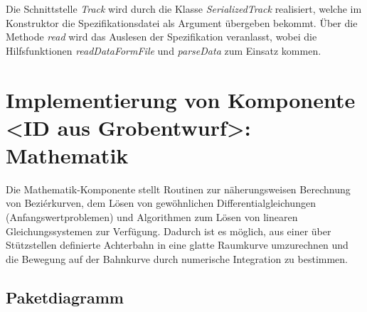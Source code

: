 Die Schnittstelle \emph{Track} wird durch die Klasse \emph{SerializedTrack} realisiert,
welche im Konstruktor die Spezifikationsdatei als Argument übergeben bekommt. Über
die Methode \emph{read} wird das Auslesen der Spezifikation veranlasst, wobei
die Hilfsfunktionen \emph{readDataFormFile} und \emph{parseData} zum Einsatz kommen.

\section{Implementierung von Komponente
         <ID aus Grobentwurf>: Mathematik}

Die Mathematik-Komponente stellt Routinen zur näherungsweisen Berechnung
von Beziérkurven, dem Lösen von gewöhnlichen Differentialgleichungen 
(Anfangswertproblemen) und Algorithmen zum Lösen von linearen Gleichungssystemen
zur Verfügung. Dadurch ist es möglich, aus einer über Stützstellen definierte 
Achterbahn in eine glatte Raumkurve umzurechnen und die Bewegung auf
der Bahnkurve durch numerische Integration zu bestimmen.

\subsection{Paketdiagramm}

